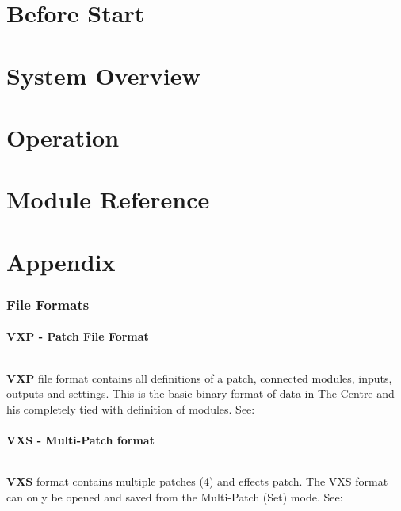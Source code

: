 
\newpage
\tableofcontents

\ifdefined\USERMANUAL
\newpage
\part{Before Start}
\newpage
\newpage
\newpage
\newpage

\newpage
\part{System Overview}
\newpage

\newpage
\part{Operation}
\newpage
\newpage
\newpage
\clearpage
\fi

\newpage
\part{Module Reference}



\ifdefined\USERMANUAL
\newpage
\part{Appendix}
\newpage
\section{File Formats}\label{section:fileformats}
\subsection{VXP - Patch File Format}
\paragraph*{}%
\textbf{VXP} file format contains all definitions of a patch, connected modules, inputs, outputs and settings. This is the basic binary format of data in The Centre and his completely tied with definition of modules. See: \underline{}
\subsection{VXS - Multi-Patch format}
\paragraph*{}%
\textbf{VXS} format contains multiple patches (4) and effects patch. The VXS format can only be opened and saved from the Multi-Patch (Set) mode. See: \underline{}

\fi
